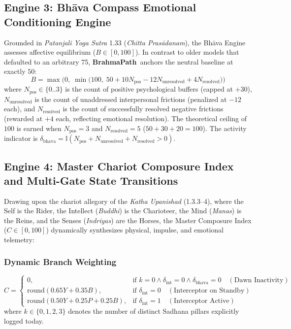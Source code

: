 \documentclass[11pt,a4paper]{article}
\newcommand{\AppName}{\textbf{BrahmaPath}}
\begin{document}
\subsection{Engine 3: Bh\=ava Compass Emotional Conditioning Engine}
Grounded in \textit{Patanjali Yoga Sutra} 1.33 (\textit{Chitta Pras\=adanam}), the Bh\=ava Engine assesses affective equilibrium ($B \in [0, 100]$). In contrast to older models that defaulted to an arbitrary 75, \AppName\ anchors the neutral baseline at exactly $50$:
\begin{equation}
    B = \max\Big(0,\; \min\Big(100,\; 50 + 10 N_{\text{pos}} - 12 N_{\text{unresolved}} + 4 N_{\text{resolved}}\Big)\Big)
\end{equation}
where $N_{\text{pos}} \in \{0..3\}$ is the count of positive psychological buffers (capped at $+30$), $N_{\text{unresolved}}$ is the count of unaddressed interpersonal frictions (penalized at $-12$ each), and $N_{\text{resolved}}$ is the count of successfully resolved negative frictions (rewarded at $+4$ each, reflecting emotional resolution). The theoretical ceiling of $100$ is earned when $N_{\text{pos}} = 3$ and $N_{\text{resolved}} = 5$ ($50 + 30 + 20 = 100$). The activity indicator is $\delta_{\text{bhava}} = \mathbb{I}(N_{\text{pos}} + N_{\text{unresolved}} + N_{\text{resolved}} > 0)$.

\subsection{Engine 4: Master Chariot Composure Index and Multi-Gate State Transitions}
Drawing upon the chariot allegory of the \textit{Katha Upanishad} (1.3.3--4), where the Self is the Rider, the Intellect (\textit{Buddhi}) is the Charioteer, the Mind (\textit{Manas}) is the Reins, and the Senses (\textit{Indriyas}) are the Horses, the Master Composure Index ($C \in [0, 100]$) dynamically synthesizes physical, impulse, and emotional telemetry:

\subsubsection{Dynamic Branch Weighting}
\begin{equation}
    C = \begin{cases}
        0, & \text{if } k = 0 \land \delta_{\text{int}} = 0 \land \delta_{\text{bhava}} = 0 \quad (\text{Dawn Inactivity}) \\
        \text{round}(0.65 Y + 0.35 B), & \text{if } \delta_{\text{int}} = 0 \quad (\text{Interceptor on Standby}) \\
        \text{round}(0.50 Y + 0.25 P + 0.25 B), & \text{if } \delta_{\text{int}} = 1 \quad (\text{Interceptor Active})
    \end{cases}
\end{equation}
where $k \in \{0, 1, 2, 3\}$ denotes the number of distinct Sadhana pillars explicitly logged today.
\end{document}
